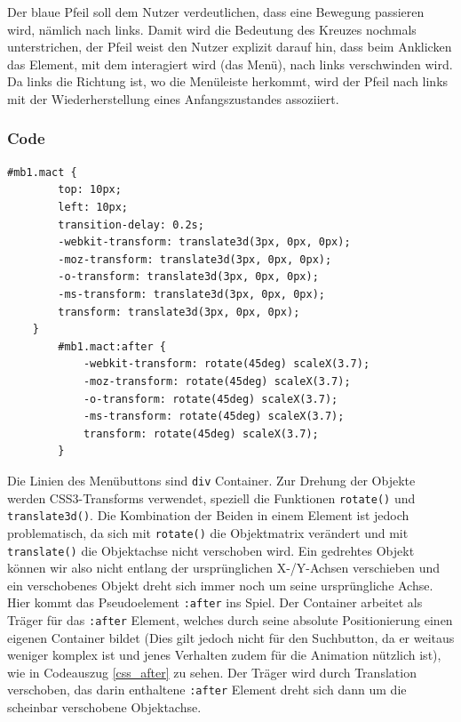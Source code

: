 Der blaue Pfeil soll dem Nutzer verdeutlichen, dass eine Bewegung passieren wird, nämlich nach links. Damit wird die Bedeutung des Kreuzes nochmals unterstrichen, der Pfeil weist den Nutzer explizit darauf hin, dass beim Anklicken das Element, mit dem interagiert wird (das Menü), nach links verschwinden wird. Da links die Richtung ist, wo die Menüleiste herkommt, wird der Pfeil nach links mit der Wiederherstellung eines Anfangszustandes assoziiert.


\subsubsection{Code}


\begin{lstlisting}[caption=Die Trennung von rotate() und translate()., label=css_after]
#mb1.mact {
        top: 10px;
        left: 10px;
        transition-delay: 0.2s;
        -webkit-transform: translate3d(3px, 0px, 0px);
        -moz-transform: translate3d(3px, 0px, 0px);
        -o-transform: translate3d(3px, 0px, 0px);
        -ms-transform: translate3d(3px, 0px, 0px);
        transform: translate3d(3px, 0px, 0px);
    }
        #mb1.mact:after {
            -webkit-transform: rotate(45deg) scaleX(3.7);
            -moz-transform: rotate(45deg) scaleX(3.7);
            -o-transform: rotate(45deg) scaleX(3.7);
            -ms-transform: rotate(45deg) scaleX(3.7);
            transform: rotate(45deg) scaleX(3.7);
        }
\end{lstlisting}

Die Linien des Menübuttons sind \lstinline{div} Container. Zur Drehung der Objekte werden CSS3-Transforms verwendet, speziell die Funktionen \lstinline{rotate()} und \lstinline{translate3d()}. Die Kombination der Beiden in einem Element ist jedoch problematisch, da sich mit \lstinline{rotate()} die Objektmatrix verändert und mit \lstinline{translate()} die Objektachse nicht verschoben wird. Ein gedrehtes Objekt können wir also nicht entlang der ursprünglichen X-/Y-Achsen verschieben und ein verschobenes Objekt dreht sich immer noch um seine ursprüngliche Achse. Hier kommt das Pseudoelement \lstinline{:after} ins Spiel. Der Container arbeitet als Träger für das \lstinline{:after} Element, welches durch seine absolute Positionierung einen eigenen Container bildet (Dies gilt jedoch nicht für den Suchbutton, da er weitaus weniger komplex ist und jenes Verhalten zudem für die Animation nützlich ist), wie in Codeauszug \ref{css_after} zu sehen. Der Träger wird durch Translation verschoben, das darin enthaltene \lstinline{:after} Element dreht sich dann um die scheinbar verschobene Objektachse.


